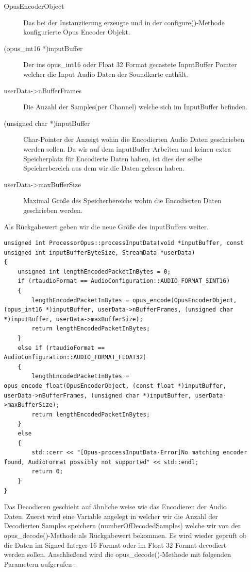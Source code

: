\begin{description}
\item[OpusEncoderObject] Das bei der Instanziierung erzeugte und in der configure()-Methode konfigurierte Opus Encoder Objekt.
\item[(opus\_int16 *)inputBuffer] Der ins opus\_int16 oder Float 32 Format gecastete InputBuffer Pointer welcher die Input Audio Daten der Soundkarte enthält.
\item[userData->nBufferFrames] Die Anzahl der Samples(per Channel) welche sich im InputBuffer befinden.
\item[(unsigned char *)inputBuffer] Char-Pointer der Anzeigt wohin die Encodierten Audio Daten geschrieben werden sollen. Da wir auf dem inputBuffer Arbeiten und keinen extra Speicherplatz für Encodierte Daten haben, ist dies der selbe Speicherbereich aus dem wir die Daten gelesen haben.
\item[userData->maxBufferSize] Maximal Größe des Speicherbereichs wohin die Encodierten Daten geschrieben werden.
\end{description}

Als Rückgabewert geben wir die neue Größe des inputBuffers weiter. 


\begin{lstlisting}[caption={Encodieren von Audio Daten mittels Opus},label={Code:Opus}]
unsigned int ProcessorOpus::processInputData(void *inputBuffer, const unsigned int inputBufferByteSize, StreamData *userData)
{
    unsigned int lengthEncodedPacketInBytes = 0;
    if (rtaudioFormat == AudioConfiguration::AUDIO_FORMAT_SINT16)
    {
        lengthEncodedPacketInBytes = opus_encode(OpusEncoderObject, (opus_int16 *)inputBuffer, userData->nBufferFrames, (unsigned char *)inputBuffer, userData->maxBufferSize);
        return lengthEncodedPacketInBytes;
    }
    else if (rtaudioFormat == AudioConfiguration::AUDIO_FORMAT_FLOAT32)
    {
        lengthEncodedPacketInBytes = opus_encode_float(OpusEncoderObject, (const float *)inputBuffer, userData->nBufferFrames, (unsigned char *)inputBuffer, userData->maxBufferSize);
        return lengthEncodedPacketInBytes;
    }
    else
    {
        std::cerr << "[Opus-processInputData-Error]No matching encoder found, AudioFormat possibly not supported" << std::endl;
        return 0;
    }
}
\end{lstlisting}

Das Decodieren geschieht auf ähnliche weise wie das Encodieren der Audio Daten.
Zuerst wird eine Variable angelegt in welcher wir die Anzahl der Decodierten Samples speichern (numberOfDecodedSamples) welche wir von der opus\_decode()-Methode als Rückgabewert bekommen. Es wird wieder geprüft ob die Daten im Signed Integer 16 Format oder im Float 32 Format decodiert werden sollen. Anschließend wird die opus\_decode()-Methode mit folgenden Parametern aufgerufen :

